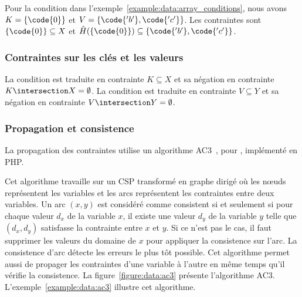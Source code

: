 Pour la condition  dans
l'exemple~\ref{example:data:array_conditions}, nous avons $K = \{\code{0}\}$ et
$V = \{\code{'b'}, \code{'c'}\}$. Les contraintes sont $\{\code{0}\} \subseteq
X$ et $\hat{H}(\{\code{0}\}) \subseteq \{\code{'b'}, \code{'c'}\}$.

\subsubsection{Contraintes sur les clés et les valeurs}

La condition  est traduite en contrainte $K \subseteq X$ et sa
négation  en contrainte $K \intersection X = \emptyset$. La
condition  est traduite en contrainte $V \subseteq Y$ et sa
négation  en contrainte $V \intersection Y = \emptyset$.

\subsubsection{Propagation et consistence}

La propagation des contraintes utilise un algorithme AC3~,
pour , implémenté en PHP.

Cet algorithme travaille sur un CSP transformé en graphe dirigé où les nœuds
représentent les variables et les arcs représentent les contraintes entre deux
variables. Un arc $(x, y)$ est considéré comme consistent si et seulement si
pour chaque valeur $d_x$ de la variable $x$, il existe une valeur $d_y$ de la
variable $y$ telle que $(d_x, d_y)$ satisfasse la contrainte entre $x$ et $y$.
Si ce n'est pas le cas, il faut supprimer les valeurs du domaine de $x$ pour
appliquer la consistence sur l'arc. La consistence d'arc détecte les erreurs le
plus tôt possible. Cet algorithme permet aussi de propager les contraintes d'une
variable à l'autre en même temps qu'il vérifie la consistence. La
figure~\ref{figure:data:ac3} présente l'algorithme AC3.
L'exemple~\ref{example:data:ac3} illustre cet algorithme.


